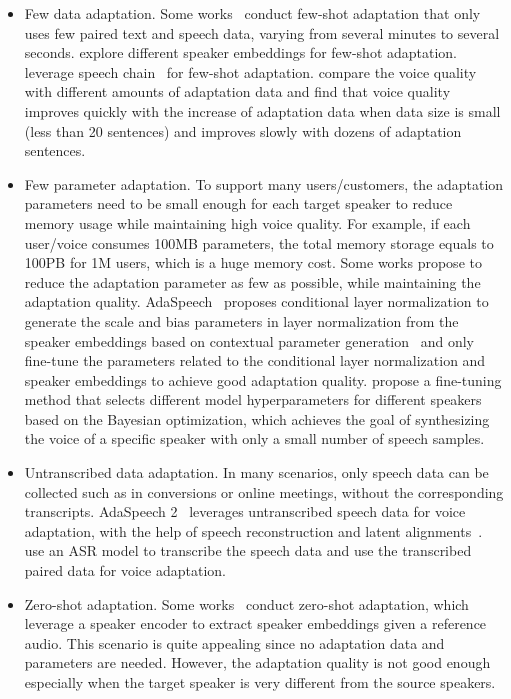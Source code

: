 \documentclass{article}
\begin{document}
\begin{itemize}[leftmargin=*]
    \item Few data adaptation. Some works~\cite{chen2018sample,arik2018neural,kons2019high,moss2020boffin,zhang2020adadurian,choi2020attentron,chien2021investigating,chen2021adaspeech,min2021meta} conduct few-shot adaptation that only uses few paired text and speech data, varying from several minutes to several seconds. \citet{chien2021investigating} explore different speaker embeddings for few-shot adaptation. \citet{yue2021exploring} leverage speech chain~\cite{tjandra2017listening} for few-shot adaptation. \citet{chen2021adaspeech,arik2018neural} compare the voice quality with different amounts of adaptation data and find that voice quality improves quickly with the increase of adaptation data when data size is small (less than 20 sentences) and improves slowly with dozens of adaptation sentences. 
    \item Few parameter adaptation. To support many users/customers, the adaptation parameters need to be small enough for each target speaker to reduce memory usage while maintaining high voice quality. For example, if each user/voice consumes 100MB parameters, the total memory storage equals to 100PB for 1M users, which is a huge memory cost. Some works propose to reduce the adaptation parameter as few as possible, while maintaining the adaptation quality. AdaSpeech~\cite{chen2021adaspeech} proposes conditional layer normalization to generate the scale and bias parameters in layer normalization from the speaker embeddings based on contextual parameter generation~\cite{platanios2018contextual} and only fine-tune the parameters related to the conditional layer normalization and speaker embeddings to achieve good adaptation quality. \citet{moss2020boffin} propose a fine-tuning method that selects different model hyperparameters for different speakers based on the Bayesian optimization, which achieves the goal of synthesizing the voice of a specific speaker with only a small number of speech samples.
    \item Untranscribed data adaptation. In many scenarios, only speech data can be collected such as in conversions or online meetings, without the corresponding transcripts. AdaSpeech 2~\cite{yan2021adaspeech} leverages untranscribed speech data for voice adaptation, with the help of speech reconstruction and latent alignments~\cite{luong2020nautilus}. \citet{inoue2020semi} use an ASR model to transcribe the speech data and use the transcribed paired data for voice adaptation.
    \item Zero-shot adaptation. Some works~\cite{arik2018neural,chen2018sample,jia2018transfer,cooper2020zero,casanova2021sc} conduct zero-shot adaptation, which leverage a speaker encoder to extract speaker embeddings given a reference audio. This scenario is quite appealing since no adaptation data and parameters are needed. However, the adaptation quality is not good enough especially when the target speaker is very different from the source speakers.
\end{itemize}  
  
\end{document}
